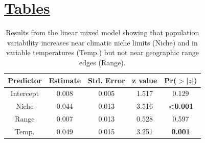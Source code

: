 \section*{\textbf{\underline{Tables}}}

\begin{table}[H]
\centering
  \caption[Results from linear mixed effect model]{Results from the linear mixed model showing that population variability increases near climatic niche limits (Niche) and in variable temperatures (Temp.) but not near geographic range edges (Range).}
  \vspace*{3mm}
\begin{tabular}{ccccc}
  \hline
 Predictor & Estimate & Std. Error & z value & Pr($>$|$z$|) \\ 
  \hline
  Intercept & 0.008 & 0.005 & 1.517 & 0.129 \\ 
  Niche & 0.044 & 0.013 & 3.516 & \textbf{<0.001} \\ 
  Range & 0.007 & 0.013 & 0.528 & 0.597 \\ 
  Temp. & 0.049 & 0.015 & 3.251 & \textbf{0.001} \\ 
   \hline
\end{tabular}
\label{tab:lmm_main}
\end{table}

